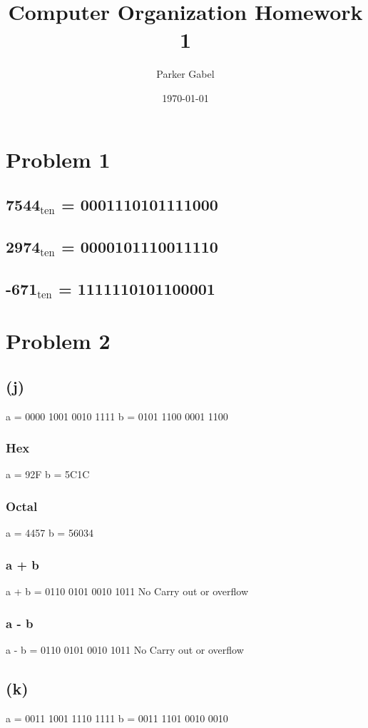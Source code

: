 \documentclass[11pt]{article}
\author{Parker Gabel}
\date{\today}
\title{Computer Organization Homework 1}
\begin{document}
\maketitle

\section{Problem 1}
\label{sec:orgd22e349}
\subsection{7544\(_{\text{ten}}\) = 0001110101111000}
\label{sec:orgfcaf14d}
\subsection{2974\(_{\text{ten}}\) = 0000101110011110}
\label{sec:org89f846e}
\subsection{-671\(_{\text{ten}}\) = 1111110101100001}
\label{sec:org5c3107c}
\section{Problem 2}
\label{sec:org22170bd}
\subsection{(j)}
\label{sec:org3092ec5}
a = 0000 1001 0010 1111
b = 0101 1100 0001 1100
\subsubsection{Hex}
\label{sec:orgd4458c3}
a = 92F
b = 5C1C
\subsubsection{Octal}
\label{sec:org1d9033f}
a = 4457
b = 56034
\subsubsection{a + b}
\label{sec:org853bc92}
a + b = 0110 0101 0010 1011
No Carry out or overflow
\subsubsection{a - b}
\label{sec:org3f7f2fc}
a - b = 0110 0101 0010 1011
No Carry out or overflow
\subsection{(k)}
\label{sec:org3f6ba94}
a = 0011 1001 1110 1111
b = 0011 1101 0010 0010
\end{document}
